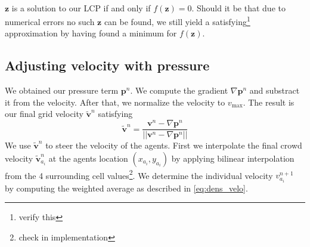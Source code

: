 \documentclass{article}
\let\oldtil\tilde
\renewcommand{\vec}[1]{\mathbf{#1}}
\renewcommand{\tilde}[1]{\oldtil{\mathbf{#1}}}
\begin{document}
\ \\
$\vec{z}$ is a solution to our LCP if and only if $f(\vec{z})=0$. Should it be that due to numerical errors no such $\vec{z}$ can be found, we still yield a satisfying\footnote{verify this} approximation by having found a minimum for $f(\vec{z})$.
\subsection{Adjusting velocity with pressure}
We obtained our pressure term $\vec{p}^n$. We compute the gradient $\nabla\vec{p}^n$ and substract it from the velocity. After that, we normalize the velocity to $v_{\max}$.
The result is our final grid velocity $\tilde{v}^n$ satisfying
\begin{equation}
	\tilde{v}^n = \frac{\vec{v}^n-\nabla\vec{p}^n}{||\vec{v}^n-\nabla\vec{p}^n||}
	\label{eq:finvelocity}
\end{equation}
We use $\tilde{v}^n$ to steer the velocity of the agents. First we interpolate the final crowd velocity $\tilde{v}^n_{a_i}$ at the agents location $(x_{a_i},y_{a_i})$ by applying bilinear interpolation from the 4 surrounding cell values\footnote{check in implementation}. We determine the individual velocity $v^{n+1}_{a_i}$ by computing the weighted average as described in \eqref{eq:dens_velo}.


 
\end{document}
